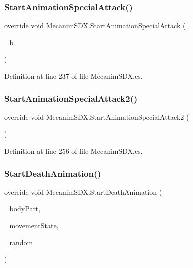 \subsubsection{\texorpdfstring{StartAnimationSpecialAttack()}{StartAnimationSpecialAttack()}}
{\footnotesize\ttfamily override void Mecanim\+S\+D\+X.\+Start\+Animation\+Special\+Attack (\begin{DoxyParamCaption}\item[{bool}]{\+\_\+b }\end{DoxyParamCaption})}



Definition at line 237 of file Mecanim\+S\+D\+X.\+cs.

\mbox{\label{class_mecanim_s_d_x_af08e226abe0cacc72cced0bb6db08480}} 
\subsubsection{\texorpdfstring{StartAnimationSpecialAttack2()}{StartAnimationSpecialAttack2()}}
{\footnotesize\ttfamily override void Mecanim\+S\+D\+X.\+Start\+Animation\+Special\+Attack2 (\begin{DoxyParamCaption}{ }\end{DoxyParamCaption})}



Definition at line 256 of file Mecanim\+S\+D\+X.\+cs.

\mbox{\label{class_mecanim_s_d_x_a81a3f3be4926e6d1e9b087781eb267ac}} 
\subsubsection{\texorpdfstring{StartDeathAnimation()}{StartDeathAnimation()}}
{\footnotesize\ttfamily override void Mecanim\+S\+D\+X.\+Start\+Death\+Animation (\begin{DoxyParamCaption}\item[{Enum\+Body\+Part\+Hit}]{\+\_\+body\+Part,  }\item[{int}]{\+\_\+movement\+State,  }\item[{float}]{\+\_\+random }\end{DoxyParamCaption})}



